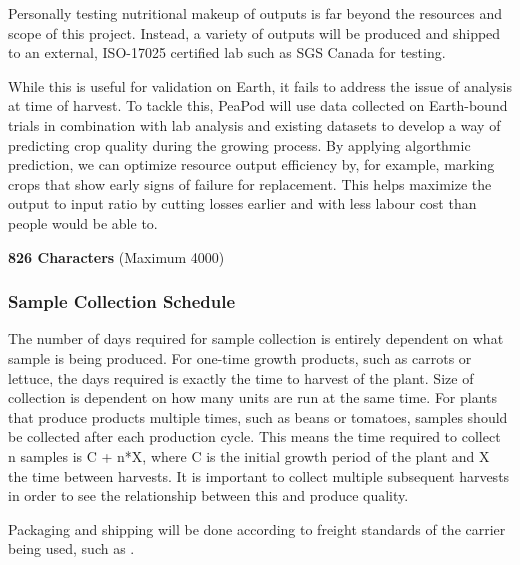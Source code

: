 Personally testing nutritional makeup of outputs is far beyond the resources and scope of this project. Instead, a variety of outputs will be produced and shipped to an external, ISO-17025 certified lab such as SGS Canada for testing.

While this is useful for validation on Earth, it fails to address the issue of analysis at time of harvest. To tackle this, PeaPod will use data collected on Earth-bound trials in combination with lab analysis and existing datasets to develop a way of predicting crop quality during the growing process. By applying algorthmic prediction, we can optimize resource output efficiency by, for example, marking crops that show early signs of failure for replacement. This helps maximize the output to input ratio by cutting losses earlier and with less labour cost than people would be able to.


\textbf{826 Characters} (Maximum 4000)

\subsubsection{Sample Collection Schedule}

The number of days required for sample collection is entirely dependent on what sample is being produced. For one-time growth products, such as carrots or lettuce, the days required is exactly the time to harvest of the plant. Size of collection is dependent on how many units are run at the same time. For plants that produce products multiple times, such as beans or tomatoes, samples should be collected after each production cycle. This means the time required to collect n samples is C + n*X, where C is the initial growth period of the plant and X the time between harvests. It is important to collect multiple subsequent harvests in order to see the relationship between this and produce quality.

Packaging and shipping will be done according to freight standards of the carrier being used, such as \cite{shipping}. 


